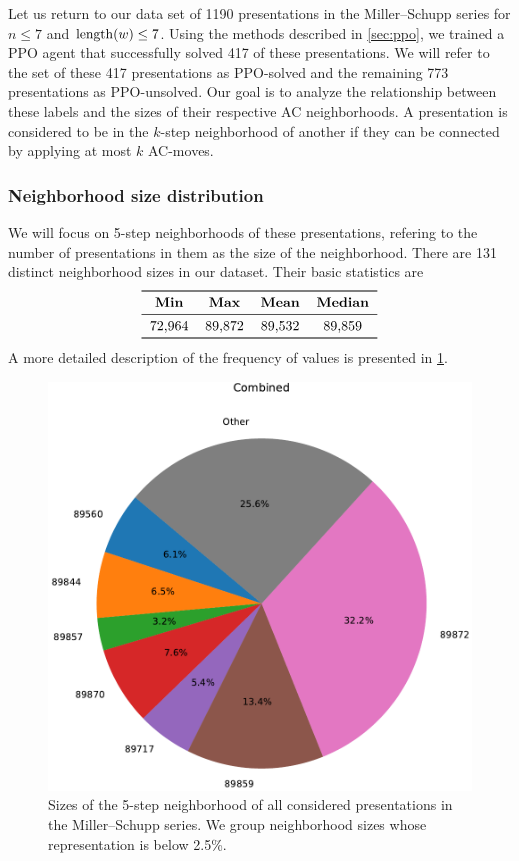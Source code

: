Let us return to our data set of 1190 presentations in the Miller--Schupp series for \(n \leq 7\) and \(\operatorname{length}(w) \leq 7\).
Using the methods described in \cref{sec:ppo}, we trained a PPO agent that successfully solved 417 of these presentations.
We will refer to the set of these 417 presentations as PPO-solved and the remaining 773 presentations as PPO-unsolved.
Our goal is to analyze the relationship between these labels and the sizes of their respective AC neighborhoods.
A presentation is considered to be in the \(k\)-step neighborhood of another if they can be connected by applying at most \(k\) AC-moves.

\subsubsection{Neighborhood size distribution}

We will focus on 5-step neighborhoods of these presentations,  refering to the number of presentations in them as the size of the neighborhood.
There are 131 distinct neighborhood sizes in our dataset.
Their basic statistics are
\[
\begin{tabular}{cccccc}
	\toprule
	\textbf{Min} & \textbf{Max} & \textbf{Mean} & \textbf{Median} \\
	\midrule
	72,964 & 89,872 & 89,532 & 89,859 \\
	\bottomrule
\end{tabular}
\]
A more detailed description of the frequency of values is presented in \cref{fig:prime_combined_pie}.

\begin{figure}
	\includegraphics[scale=.4]{fig/prime_combined_pie_rl_cropped.pdf}
	\caption{Sizes of the 5-step neighborhood of all considered presentations in the Miller--Schupp series. We group neighborhood sizes whose representation is below 2.5\%.}
	\label{fig:prime_combined_pie}
\end{figure}

